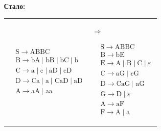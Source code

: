 \documentclass[12pt,onecolumn]{article}
\newcommand{\chtb}[4]{
  \begin{center}
    \textbf{#2}
  \end{center}
  \begin{center}
    \begin{tabularx}{#1}{X|X}
    $\begin{aligned}
          #3
      \end{aligned}$ &
    \begin{minipage}{1em}
      $\Rightarrow$
    \end{minipage}
    $\begin{aligned}
         #4
      \end{aligned}$
    \end{tabularx}
  \end{center}
}
\begin{document}
\chtb{0.6\textwidth}
{Стало:}
{
    & \mathrm{S} \rightarrow \mathrm{A B B C}                                                \\
    & \mathrm{B} \rightarrow \mathrm{b A}\mid \mathrm{b B} \mid \mathrm{b C} \mid \mathrm{b} \\
    & \mathrm{C} \to \mathrm{a} \mid \mathrm{c} \mid \mathrm{aD} \mid \mathrm{cD}            \\
    & \mathrm{D} \to \mathrm{Ca} \mid \mathrm{a} \mid \mathrm{CaD} \mid \mathrm{aD}          \\
    & \mathrm{A} \rightarrow \mathrm{aA} \mid \mathrm{aa}
}
{
    & \mathrm{S} \rightarrow \mathrm{A B B C}                                            \\
    & \mathrm{B} \rightarrow \mathrm{b E}                                                \\
    & \mathrm{E} \rightarrow \mathrm{A} \mid \mathrm{B} \mid \mathrm{C} \mid \varepsilon \\
    & \mathrm{C} \to \mathrm{aG} \mid \mathrm{cG}                                        \\
    & \mathrm{D} \to \mathrm{CaG} \mid \mathrm{aG}                                       \\
    & \mathrm{G} \to \mathrm{D} \mid \varepsilon                                         \\
    & \mathrm{A} \rightarrow \mathrm{aF}                                                 \\
    & \mathrm{F} \rightarrow \mathrm{A} \mid \mathrm{a}
}
\end{document}
